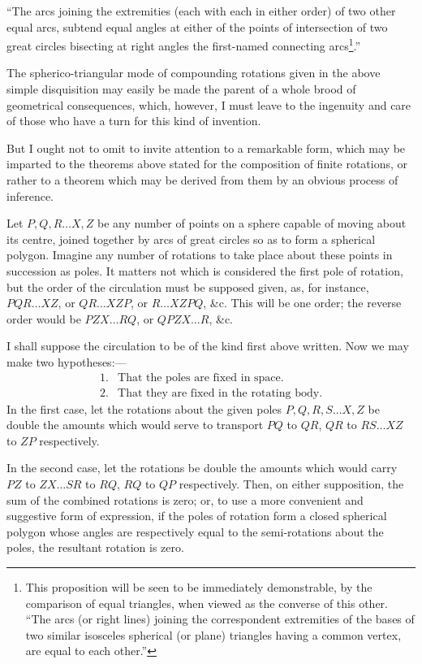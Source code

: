 \documentclass[11pt]{article}
\begin{document}
{{``The arcs joining the extremities (each with each in either order) of two other equal arcs, subtend equal angles at either of the points of intersection of two great circles bisecting at right angles the first-named connecting arcs\footnote{This proposition will be seen to be immediately demonstrable, by the comparison of equal triangles, when viewed as the converse of this other. ``The arcs (or right lines) joining the correspondent extremities of the bases of two similar isosceles spherical (or plane) triangles having a common vertex, are equal to each other.''}.''

The spherico-triangular mode of compounding rotations given in the above simple disquisition may easily be made the parent of a whole brood of geometrical consequences, which, however, I must leave to the ingenuity and care of those who have a turn for this kind of invention.

But I ought not to omit to invite attention to a remarkable form, which may be imparted to the theorems above stated for the composition of finite rotations, or rather to a theorem which may be derived from them by an obvious process of inference.

Let $P,Q,R\ldots X,Z$ be any number of points on a sphere capable of moving about its centre, joined together by arcs of great circles so as to form a spherical polygon. Imagine any number of rotations to take place about these points in succession as poles. It matters not which is considered the first pole of rotation, but the order of the circulation must be supposed given, as, for instance, $PQR\ldots XZ$, or $QR\ldots XZP$, or $R\ldots XZPQ$, \&c. This will be one order; the reverse order would be $PZX\ldots RQ$, or $QPZX\ldots R$, \&c.

I shall suppose the circulation to be of the kind first above written. Now we may make two hypotheses:---
\[
\begin{array}{ll}
1.& \text{That the poles are fixed in space.}\\
2.& \text{That they are fixed in the rotating body.}
\end{array}
\]
In the first case, let the rotations about the given poles $P,Q,R,S\ldots X,Z$ be double the amounts which would serve to transport $PQ$ to $QR$, $QR$ to $RS\ldots XZ$ to $ZP$ respectively.

In the second case, let the rotations be double the amounts which would carry $PZ$ to $ZX\ldots SR$ to $RQ$, $RQ$ to $QP$ respectively. Then, on either supposition, the sum of the combined rotations is zero; or, to use a more convenient and suggestive form of expression, if the poles of rotation form a closed spherical polygon whose angles are respectively equal to the semi-rotations about the poles, the resultant rotation is zero.

}}
\end{document}
